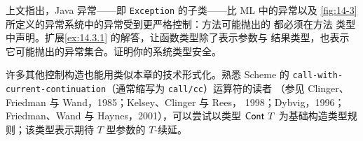 \begin{exercise}[\(\star\star\star\star\)]
\label{ex:14.3.2}
上文指出，Java 异常——即 \texttt{Exception} 的子类——比 ML 中的异常以及
\cref{fig:14-3} 所定义的异常系统中的异常受到更严格控制：方法可能抛出的
都必须在方法
类型中声明。扩展\cref{ex:14.3.1} 的解答，让函数类型除了表示参数与
结果类型，也表示它可能抛出的异常集合。证明你的系统类型安全。
\end{exercise}

\begin{exercise}[\(\star\star\star\)]
\label{ex:14.3.3}
许多其他控制构造也能用类似本章的技术形式化。熟悉 Scheme 的
\texttt{call-with-current-continuation}（通常缩写为 \texttt{call/cc}）运算符的读者
（参见 Clinger、Friedman 与 Wand，1985；Kelsey、Clinger 与 Rees，
1998；Dybvig，1996；Friedman、Wand 与 Haynes，2001），可以尝试以类型
\(\mathsf{Cont}\ T\) 为基础构造类型规则；该类型表示期待 \(T\) 型参数的
\(T\)-续延。
\end{exercise}
